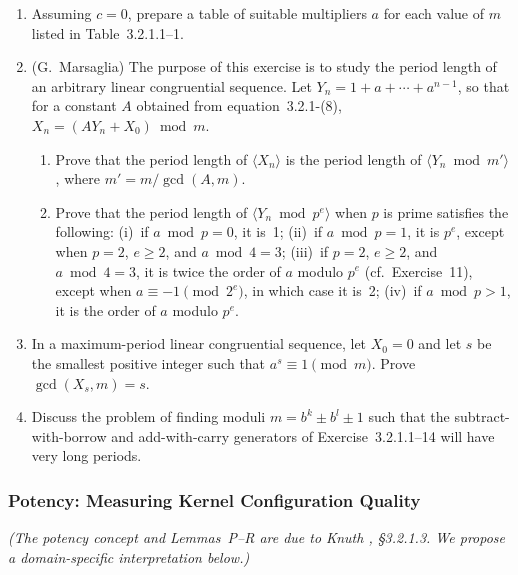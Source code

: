 \documentclass[12pt]{article}
\begin{document}
\begin{enumerate}
\item[\textbf{19.}] [40] Assuming $c = 0$, prepare a table of suitable multipliers $a$ for each value of $m$ listed in Table~3.2.1.1--1.

\item[\textbf{20.}] [$M24$] (G.~Marsaglia) The purpose of this exercise is to study the period length of an arbitrary linear congruential sequence. Let $Y_n = 1 + a + \cdots + a^{n-1}$, so that for a constant $A$ obtained from equation~3.2.1-(8), $X_n = (AY_n + X_0) \bmod m$.

\begin{enumerate}
\item[a)] Prove that the period length of $\langle X_n \rangle$ is the period length of $\langle Y_n \bmod m' \rangle$, where $m' = m/\gcd(A, m)$.
\item[b)] Prove that the period length of $\langle Y_n \bmod p^e \rangle$ when $p$ is prime satisfies the following: (i)~if $a \bmod p = 0$, it is~1; (ii)~if $a \bmod p = 1$, it is $p^e$, except when $p = 2$, $e \geq 2$, and $a \bmod 4 = 3$; (iii)~if $p = 2$, $e \geq 2$, and $a \bmod 4 = 3$, it is twice the order of $a$ modulo $p^e$ (cf.\ Exercise~11), except when $a \equiv -1 \pmod{2^e}$, in which case it is~2; (iv)~if $a \bmod p > 1$, it is the order of $a$ modulo $p^e$.
\end{enumerate}

\item[\textbf{21.}] [$M25$] In a maximum-period linear congruential sequence, let $X_0 = 0$ and let $s$ be the smallest positive integer such that $a^s \equiv 1 \pmod{m}$. Prove $\gcd(X_s, m) = s$.

\item[\textbf{22.}] [$M25$] Discuss the problem of finding moduli $m = b^k \pm b^l \pm 1$ such that the subtract-with-borrow and add-with-carry generators of Exercise~3.2.1.1--14 will have very long periods.
\end{enumerate}


\subsubsection{Potency: Measuring Kernel Configuration Quality}
\label{sec:3.2.1.3}

\noindent\textit{(The potency concept and Lemmas~P--R are due to Knuth \citep{knuth1997taocp2}, \S3.2.1.3. We propose a domain-specific interpretation below.)}
\end{document}

